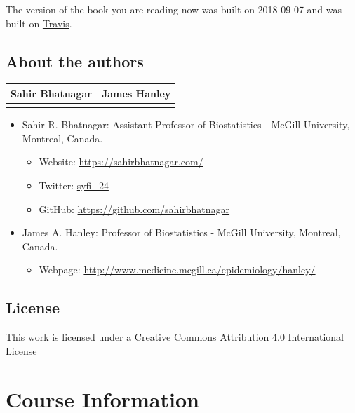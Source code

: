 \documentclass[]{book}
\providecommand{\tightlist}{%
  \setlength{\itemsep}{0pt}\setlength{\parskip}{0pt}}
\providecommand{\tightlist}{%
  \setlength{\itemsep}{0pt}\setlength{\parskip}{0pt}}
\theoremstyle{definition}
\theoremstyle{definition}
\theoremstyle{definition}
\theoremstyle{remark}
\begin{document}
The version of the book you are reading now was built on 2018-09-07 and
was built on
\href{https://travis-ci.org/sahirbhatnagar/MATH697}{Travis}.

\section{About the authors}\label{about-the-authors}

\begin{longtable}[]{@{}cc@{}}
\toprule
Sahir Bhatnagar & James Hanley\tabularnewline
\midrule
\endhead
&\tabularnewline
\bottomrule
\end{longtable}

\begin{itemize}
\tightlist
\item
  Sahir R. Bhatnagar: Assistant Professor of Biostatistics - McGill
  University, Montreal, Canada.

  \begin{itemize}
  \tightlist
  \item
    Website: \url{https://sahirbhatnagar.com/}\\
  \item
    Twitter: \href{https://twitter.com/syfi_24}{syfi\_24}\\
  \item
    GitHub: \url{https://github.com/sahirbhatnagar}\\
  \end{itemize}
\item
  James A. Hanley: Professor of Biostatistics - McGill University,
  Montreal, Canada.

  \begin{itemize}
  \tightlist
  \item
    Webpage: \url{http://www.medicine.mcgill.ca/epidemiology/hanley/}
  \end{itemize}
\end{itemize}

\section{License}\label{license}

This work is licensed under a Creative Commons Attribution 4.0
International License

\chapter{Course Information}\label{course-information}
\end{document}
